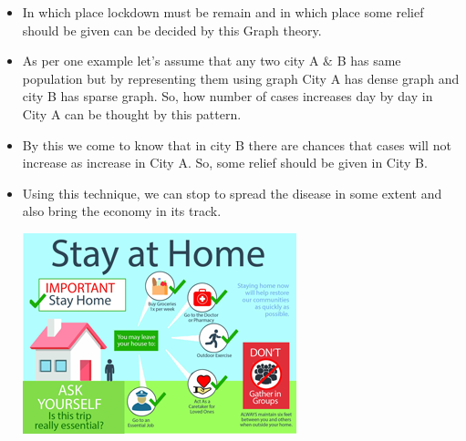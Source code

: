 \documentclass[12pt]{article}
\begin{document}
{\begin{itemize}
\item 	In which place lockdown must be remain and in which place some relief should be given can be decided by this Graph theory.
\item As per one example let’s assume that any two city A $\&$  B has same population but by representing them using graph City A has dense graph and city B has sparse graph. So, how number of cases increases day by day in City A can be thought by this pattern.
\item 	By this we come to know that in city B there are chances that cases will not increase as increase in City A. So, some relief should be given in City B.
\item 	Using this technique, we can stop to spread the disease in some extent and also bring the economy in its track.
\\
[1.5 mm]
\begin{center}
\includegraphics{Document.png}
\end{center}
\end{itemize}
\newpage
}
\end{document}
